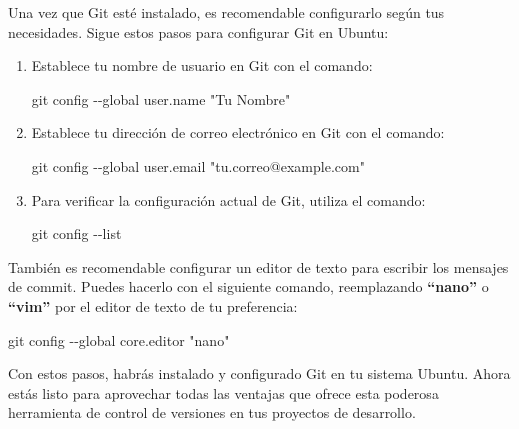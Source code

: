 \documentclass[
  letterpaper,
  DIV=11,
  numbers=noendperiod]{scrartcl}
\newenvironment{Shaded}{}{}
\newcommand{\AttributeTok}[1]{\textcolor[rgb]{0.84,0.23,0.29}{#1}}
\newcommand{\FunctionTok}[1]{\textcolor[rgb]{0.44,0.26,0.76}{#1}}
\newcommand{\NormalTok}[1]{\textcolor[rgb]{0.14,0.16,0.18}{#1}}
\newcommand{\StringTok}[1]{\textcolor[rgb]{0.01,0.18,0.38}{#1}}
\begin{document}
Una vez que Git esté instalado, es recomendable configurarlo según tus
necesidades. Sigue estos pasos para configurar Git en Ubuntu:

\begin{enumerate}
\def\labelenumi{\arabic{enumi}.}
\item
  Establece tu nombre de usuario en Git con el comando:

\begin{Shaded}
\begin{Highlighting}[]
\FunctionTok{git}\NormalTok{ config }\AttributeTok{{-}{-}global}\NormalTok{ user.name }\StringTok{"Tu Nombre"}
\end{Highlighting}
\end{Shaded}
\item
  Establece tu dirección de correo electrónico en Git con el comando:

\begin{Shaded}
\begin{Highlighting}[]
\FunctionTok{git}\NormalTok{ config }\AttributeTok{{-}{-}global}\NormalTok{ user.email }\StringTok{"tu.correo@example.com"}
\end{Highlighting}
\end{Shaded}
\item
  Para verificar la configuración actual de Git, utiliza el comando:

\begin{Shaded}
\begin{Highlighting}[]
\FunctionTok{git}\NormalTok{ config }\AttributeTok{{-}{-}list}
\end{Highlighting}
\end{Shaded}
\end{enumerate}

También es recomendable configurar un editor de texto para escribir los
mensajes de commit. Puedes hacerlo con el siguiente comando,
reemplazando \textbf{``nano''} o \textbf{``vim''} por el editor de texto
de tu preferencia:

\begin{Shaded}
\begin{Highlighting}[]
\FunctionTok{git}\NormalTok{ config }\AttributeTok{{-}{-}global}\NormalTok{ core.editor }\StringTok{"nano"}
\end{Highlighting}
\end{Shaded}

Con estos pasos, habrás instalado y configurado Git en tu sistema
Ubuntu. Ahora estás listo para aprovechar todas las ventajas que ofrece
esta poderosa herramienta de control de versiones en tus proyectos de
desarrollo.
\end{document}
